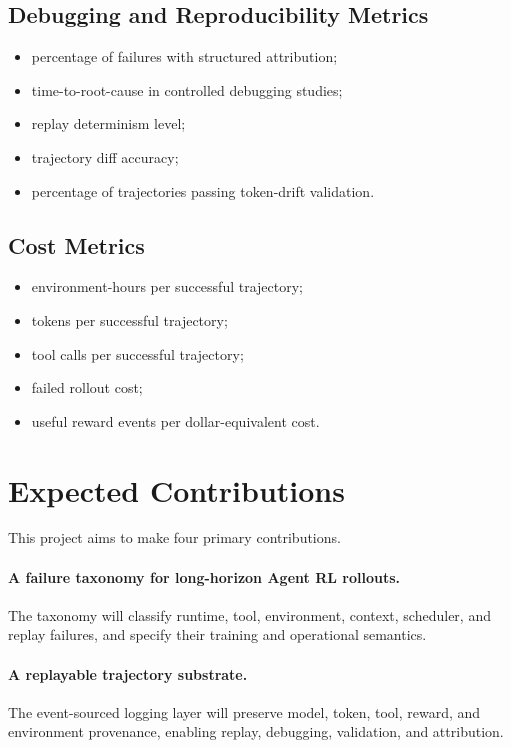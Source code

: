 \documentclass[11pt]{article}
\begin{document}
\subsection{Debugging and Reproducibility Metrics}

\begin{itemize}[leftmargin=*]
    \item percentage of failures with structured attribution;
    \item time-to-root-cause in controlled debugging studies;
    \item replay determinism level;
    \item trajectory diff accuracy;
    \item percentage of trajectories passing token-drift validation.
\end{itemize}

\subsection{Cost Metrics}

\begin{itemize}[leftmargin=*]
    \item environment-hours per successful trajectory;
    \item tokens per successful trajectory;
    \item tool calls per successful trajectory;
    \item failed rollout cost;
    \item useful reward events per dollar-equivalent cost.
\end{itemize}

\section{Expected Contributions}

This project aims to make four primary contributions.

\paragraph{A failure taxonomy for long-horizon Agent RL rollouts.}
The taxonomy will classify runtime, tool, environment, context, scheduler, and replay failures, and specify their training and operational semantics.

\paragraph{A replayable trajectory substrate.}
The event-sourced logging layer will preserve model, token, tool, reward, and environment provenance, enabling replay, debugging, validation, and attribution.
\end{document}
